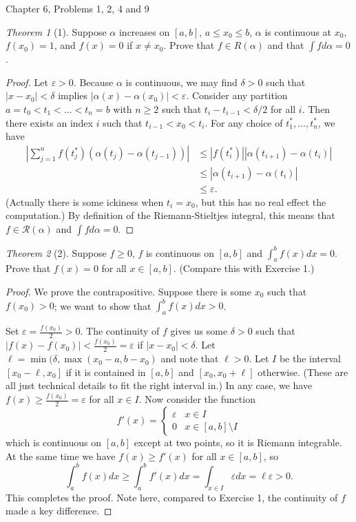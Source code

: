 \documentclass[12pt]{article}
\theoremstyle{remark}
\theoremstyle{named}
\newtheorem*{theorem}{Theorem}
\renewcommand{\a}{\alpha}
\renewcommand{\d}{\delta}
\newcommand{\e}{\varepsilon}
\newcommand{\abs}[1]{|#1|}
\newcommand{\bigabs}[1]{\left|#1\right|}
\begin{document}
Chapter 6, Problems 1, 2, 4 and 9

\begin{theorem}[1]
    Suppose \(\a\) increases on \([a, b]\), \(a \le x_0 \le b\), \(\a\) is continuous at \(x_0\), \(f(x_0) = 1\), and \(f(x) = 0\) if \(x \neq x_0\). Prove that \(f \in R(\a)\) and that \(\int f d\a = 0\).
\end{theorem}

\begin{proof}
    Let \(\e > 0\). Because \(\a\) is continuous, we may find \(\d > 0\) such that \(|x - x_0| < \d\) implies \(|\a(x) - \a(x_0)| < \e\). Consider any partition \(a = t_0 < t_1 < \dots < t_n = b\) with \(n \ge 2\) such that \(t_{i} - t_{i - 1} < \d / 2\) for all \(i\). Then there exists an index \(i\) such that \(t_{i - 1} < x_0 < t_{i}\). For any choice of \(t_1^*, \dots, t_n^*\), we have 
    \begin{align*}
        \bigabs{\sum_{j = 1}^n f(t_j^*)(\a(t_j) - \a(t_{j - 1}))} &\le \abs{f(t_i^*)}\abs{\a(t_{i + 1}) - \a(t_{i})} \\
        &\le \abs{\a(t_{i + 1}) - \a(t_{i})} \\
        &\le \e.
    \end{align*}
    (Actually there is some ickiness when \(t_i = x_0\), but this has no real effect the computation.) By definition of the Riemann-Stieltjes integral, this means that \(f \in \mathcal R(\a)\) and \(\int f d\a = 0\).
\end{proof}

\begin{theorem}[2]
    Suppose \(f \ge 0\), \(f\) is continuous on \([a, b]\) and \(\int_a^b f(x)dx = 0\). Prove that \(f(x) = 0\) for all \(x \in [a, b]\). (Compare this with Exercise 1.)
\end{theorem}

\begin{proof}
    We prove the contrapositive. Suppose there is some \(x_0\) such that \(f(x_0) > 0\); we want to show that \(\int_a^b f(x)dx > 0\). 

    Set \(\e = \frac{f(x_0)}{2} > 0\). The continuity of \(f\) gives us some \(\d > 0\) such that \(\abs{f(x) - f(x_0)} < \frac{f(x_0)}{2} = \e\) if \(\abs{x - x_0} < \d\). Let \(\ell = \min(\d, \max(x_0 - a, b - x_0)\) and note that \(\ell > 0\). Let \(I\) be the interval \([x_0 - \ell, x_0]\) if it is contained in \([a, b]\) and \([x_0, x_0 + \ell]\) otherwise. (These are all just technical details to fit the right interval in.) In any case, we have \(f(x) \ge \frac{f(x_0)}{2} = \e\) for all \(x \in I\). Now consider the function
    \[f'(x) = \begin{cases}
        \e & x \in I \\
        0 & x \in [a, b] \setminus I
    \end{cases}\]
    which is continuous on \([a, b]\) except at two points, so it is Riemann integrable. At the same time we have \(f(x) \ge f'(x)\) for all \(x \in [a, b]\), so 
    \[\int_a^b f(x)dx \ge \int_a^b f'(x)dx = \int_{x \in I} \e dx = \ell \e > 0.\]
    This completes the proof. Note here, compared to Exercise 1, the continuity of \(f\) made a key difference.
\end{proof}
\end{document}
